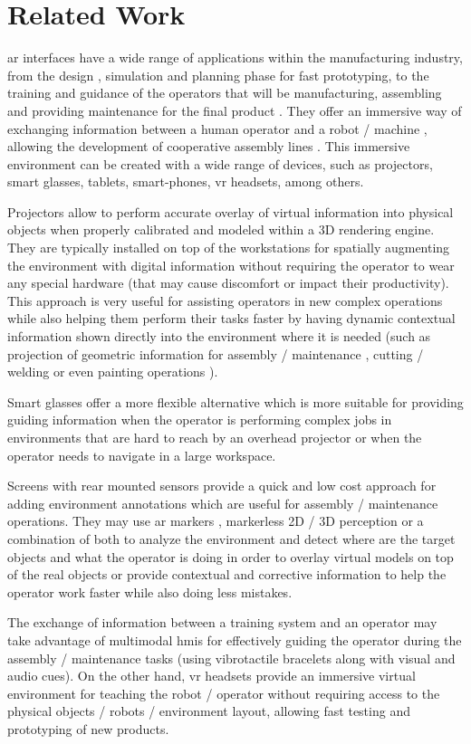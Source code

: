 \section{Related Work}\label{sec:related-work}

\gls{ar} interfaces \cite{Bimber2005} have a wide range of applications \cite{Wang2016} within the manufacturing industry, from the design \cite{Nee2012}, simulation and planning phase for fast prototyping, to the training and guidance \cite{Webel2011} of the operators that will be manufacturing, assembling and providing maintenance for the final product \cite{Zhu2014}. They offer an immersive way of exchanging information between a human operator and a robot / machine \cite{Michalos2016}, allowing the development of cooperative assembly lines \cite{Lenz2011}. This immersive environment can be created with a wide range of devices, such as projectors, smart glasses, tablets, smart-phones, \gls{vr} headsets, among others.

Projectors allow to perform accurate overlay of virtual information into physical objects when properly calibrated \cite{Moreno2012} and modeled within a 3D rendering engine. They are typically installed on top of the workstations for spatially augmenting the environment with digital information without requiring the operator to wear any special hardware (that may cause discomfort or impact their productivity). This approach is very useful for assisting operators in new complex operations while also helping them perform their tasks faster by having dynamic contextual information shown directly into the environment where it is needed (such as projection of geometric information for assembly / maintenance \cite{Uva2018}, cutting / welding \cite{Doshi2017} or even painting operations \cite{Barbosa2014}).

Smart glasses offer a more flexible alternative \cite{MICHALOS2018194} which is more suitable for providing guiding information when the operator is performing complex jobs in environments that are hard to reach by an overhead projector or when the operator needs to navigate in a large workspace.

Screens with rear mounted sensors provide a quick and low cost approach for adding environment annotations which are useful for assembly / maintenance operations. They may use \gls{ar} markers \cite{Siltanen2012}, markerless 2D / 3D perception \cite{Guo2014} or a combination of both \cite{Wang2009} to analyze the environment and detect where are the target objects and what the operator is doing \cite{Bannat2008} in order to overlay virtual models on top of the real objects or provide contextual and corrective information to help the operator work faster while also doing less mistakes.

The exchange of information between a training system and an operator may take advantage of multimodal \glspl{hmi} \cite{Webel2013} for effectively guiding the operator during the assembly / maintenance tasks (using vibrotactile bracelets along with visual and audio cues). On the other hand, \gls{vr} headsets provide an immersive virtual environment for teaching the robot / operator \cite{ABATE2009318} without requiring access to the physical objects / robots / environment layout, allowing fast testing and prototyping of new products.
